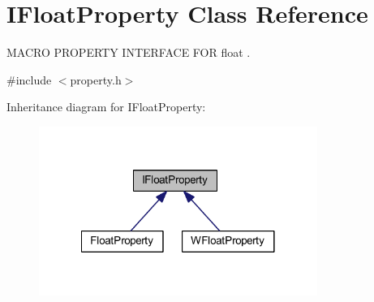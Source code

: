 \hypertarget{class_i_float_property}{\section{I\-Float\-Property Class Reference}
\label{class_i_float_property}
}


M\-A\-C\-R\-O P\-R\-O\-P\-E\-R\-T\-Y I\-N\-T\-E\-R\-F\-A\-C\-E F\-O\-R float .  




{\ttfamily \#include $<$property.\-h$>$}



Inheritance diagram for I\-Float\-Property\-:
\nopagebreak
\begin{figure}[H]
\begin{center}
\leavevmode
\includegraphics[width=257pt]{class_i_float_property__inherit__graph}
\end{center}
\end{figure}
